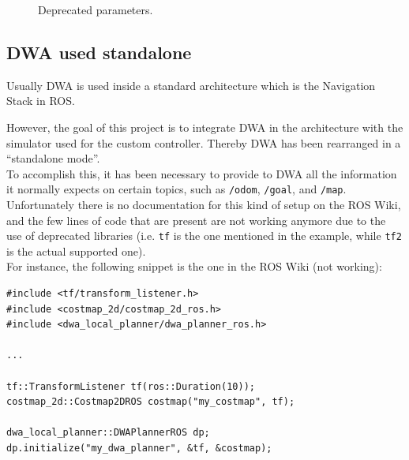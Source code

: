 \documentclass[11pt,a4paper]{article}
\begin{document}
\begin{figure}[H]
    \centering
    \quad
    \caption[]{Deprecated parameters.}
\end{figure}



\subsection{DWA used standalone}

Usually DWA is used inside a standard architecture which is the Navigation Stack in ROS.

However, the goal of this project is to integrate DWA in the architecture with the simulator used for
the custom controller. Thereby DWA has been rearranged in a ``standalone mode''.\\

To accomplish this, it has been necessary to provide to DWA all the information it normally expects on
certain topics, such as \texttt{/odom}, \texttt{/goal}, and \texttt{/map}.\\

Unfortunately there is no documentation for this kind of setup on the ROS Wiki, and the few lines of code
that are present are not working anymore due to the use of deprecated libraries (i.e. \texttt{tf} is the
one mentioned in the example, while \texttt{tf2} is the actual supported one).\\

For instance, the following snippet is the one in the ROS Wiki (not working):

\begin{lstlisting}
#include <tf/transform_listener.h>
#include <costmap_2d/costmap_2d_ros.h>
#include <dwa_local_planner/dwa_planner_ros.h>

...

tf::TransformListener tf(ros::Duration(10));
costmap_2d::Costmap2DROS costmap("my_costmap", tf);

dwa_local_planner::DWAPlannerROS dp;
dp.initialize("my_dwa_planner", &tf, &costmap);
\end{lstlisting}
\end{document}
